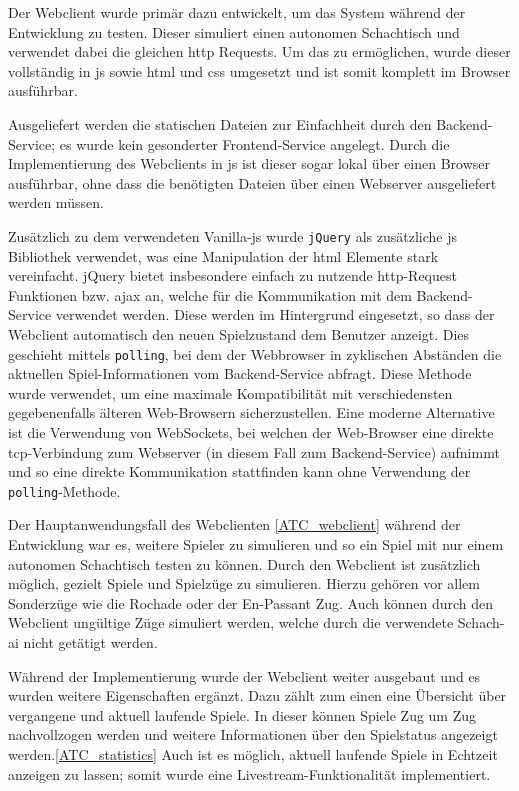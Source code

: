 Der Webclient wurde primär dazu entwickelt, um das System während der
Entwicklung zu testen. Dieser simuliert einen autonomen Schachtisch und
verwendet dabei die gleichen \gls{http} Requests. Um das zu ermöglichen,
wurde dieser vollständig in \gls{js} sowie \gls{html} und \gls{css}
umgesetzt und ist somit komplett im Browser ausführbar.

Ausgeliefert werden die statischen Dateien zur Einfachheit durch den
Backend-Service; es wurde kein gesonderter Frontend-Service angelegt.
Durch die Implementierung des Webclients in \gls{js} ist dieser sogar
lokal über einen Browser ausführbar, ohne dass die benötigten Dateien
über einen Webserver ausgeliefert werden müssen.

Zusätzlich zu dem verwendeten Vanilla-\gls{js} wurde
\passthrough{\lstinline!jQuery!}\cite{jquery} als zusätzliche
\gls{js} Bibliothek verwendet, was eine Manipulation der \gls{html}
Elemente stark vereinfacht. jQuery bietet insbesondere einfach zu
nutzende \gls{http}-Request Funktionen bzw. \gls{ajax} an, welche für
die Kommunikation mit dem Backend-Service verwendet werden. Diese werden
im Hintergrund eingesetzt, so dass der Webclient automatisch den neuen
Spielzustand dem Benutzer anzeigt. Dies geschieht mittels
\passthrough{\lstinline!polling!}, bei dem der Webbrowser in zyklischen
Abständen die aktuellen Spiel-Informationen vom Backend-Service abfragt.
Diese Methode wurde verwendet, um eine maximale Kompatibilität mit
verschiedensten gegebenenfalls älteren Web-Browsern sicherzustellen.
Eine moderne Alternative ist die Verwendung von WebSockets, bei welchen
der Web-Browser eine direkte \gls{tcp}-Verbindung zum Webserver (in
diesem Fall zum Backend-Service) aufnimmt und so eine direkte
Kommunikation stattfinden kann ohne Verwendung der
\passthrough{\lstinline!polling!}-Methode.

Der Hauptanwendungsfall des Webclienten \ref{ATC_webclient} während der
Entwicklung war es, weitere Spieler zu simulieren und so ein Spiel mit
nur einem autonomen Schachtisch testen zu können. Durch den Webclient
ist zusätzlich möglich, gezielt Spiele und Spielzüge zu simulieren.
Hierzu gehören vor allem Sonderzüge wie die Rochade oder der En-Passant
Zug. Auch können durch den Webclient ungültige Züge simuliert werden,
welche durch die verwendete Schach-\gls{ai} nicht getätigt werden.

Während der Implementierung wurde der Webclient weiter ausgebaut und es
wurden weitere Eigenschaften ergänzt. Dazu zählt zum einen eine
Übersicht über vergangene und aktuell laufende Spiele. In dieser können
Spiele Zug um Zug nachvollzogen werden und weitere Informationen über
den Spielstatus angezeigt werden.\ref{ATC_statistics} Auch ist es
möglich, aktuell laufende Spiele in Echtzeit anzeigen zu lassen; somit
wurde eine Livestream-Funktionalität implementiert.

